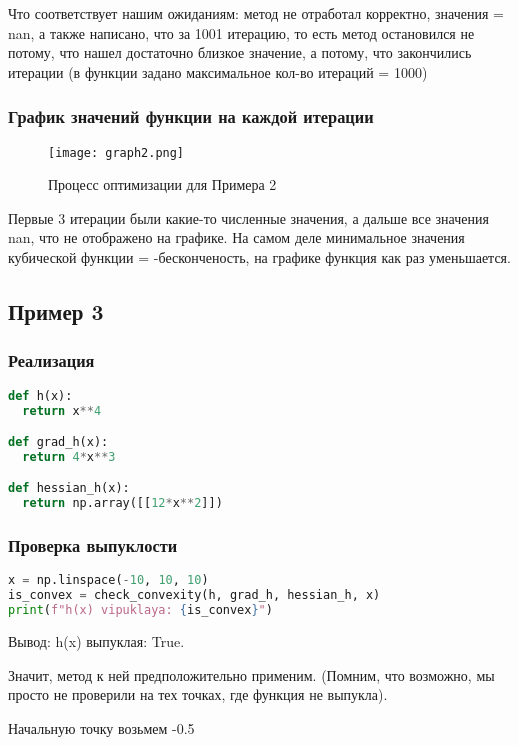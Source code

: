 \documentclass{article}
\begin{document}
Что соответствует нашим ожиданиям: метод не отработал корректно, значения = nan, а также написано, что за 1001 итерацию, то есть метод остановился не потому, что нашел достаточно близкое значение, а потому, что закончились итерации (в функции задано максимальное кол-во итераций = 1000)

\subsubsection{График значений функции на каждой итерации}
\begin{figure}[H]
    \centering
    \texttt{[image: graph2.png]}
    \caption{Процесс оптимизации для Примера 2}
\end{figure}
Первые 3 итерации были какие-то численные значения, а дальше все значения nan, что не отображено на графике. На самом деле минимальное значения кубической функции = -бесконченость, на графике функция как раз уменьшается.

\newpage
\subsection{Пример 3}

\subsubsection{Реализация}
\begin{lstlisting}[language=Python]
def h(x):
  return x**4

def grad_h(x):
  return 4*x**3

def hessian_h(x):
  return np.array([[12*x**2]])
\end{lstlisting}

\subsubsection{Проверка выпуклости}
\begin{lstlisting}[language=Python]
x = np.linspace(-10, 10, 10)
is_convex = check_convexity(h, grad_h, hessian_h, x)
print(f"h(x) vipuklaya: {is_convex}")
\end{lstlisting}

Вывод: h(x) выпуклая: True.

Значит, метод к ней предположительно применим. (Помним, что возможно, мы просто не проверили на тех точках, где функция не выпукла).

Начальную точку возьмем -0.5
\end{document}
